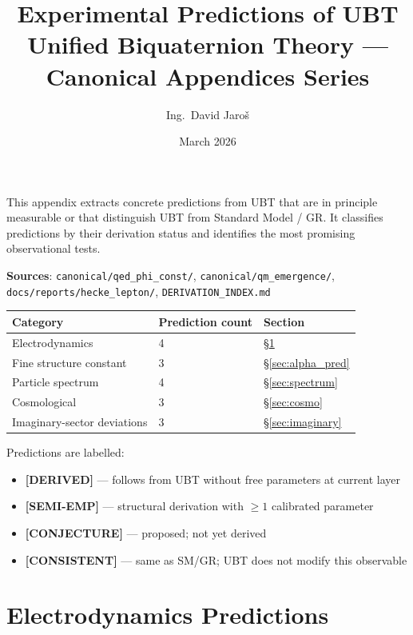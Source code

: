\documentclass[11pt,a4paper]{article}
\title{\textbf{Experimental Predictions of UBT}\\
\large Unified Biquaternion Theory — Canonical Appendices Series}
\author{Ing.\ David Jaroš}
\date{March 2026}
\theoremstyle{definition}
\theoremstyle{remark}
\begin{document}
\maketitle
\tableofcontents
\bigskip

\begin{tcolorbox}[colback=blue!4!white,colframe=blue!50!black,title=Purpose]
This appendix extracts concrete predictions from UBT that are in principle
measurable or that distinguish UBT from Standard Model / GR.
It classifies predictions by their derivation status and identifies the
most promising observational tests.

\medskip
\textbf{Sources}:
\texttt{canonical/qed\_phi\_const/},
\texttt{canonical/qm\_emergence/},
\texttt{docs/reports/hecke\_lepton/},
\texttt{DERIVATION\_INDEX.md}

\medskip
\begin{tabular}{lll}
\hline
Category & Prediction count & Section \\
\hline
Electrodynamics & 4 & \S\ref{sec:qed} \\
Fine structure constant & 3 & \S\ref{sec:alpha_pred} \\
Particle spectrum & 4 & \S\ref{sec:spectrum} \\
Cosmological & 3 & \S\ref{sec:cosmo} \\
Imaginary-sector deviations & 3 & \S\ref{sec:imaginary} \\
\hline
\end{tabular}
\end{tcolorbox}

\begin{tcolorbox}[colback=yellow!5!white,colframe=orange!60!black,title=Prediction classification]
Predictions are labelled:
\begin{itemize}
  \item \textbf{[DERIVED]} — follows from UBT without free parameters at current layer
  \item \textbf{[SEMI-EMP]} — structural derivation with $\geq 1$ calibrated parameter
  \item \textbf{[CONJECTURE]} — proposed; not yet derived
  \item \textbf{[CONSISTENT]} — same as SM/GR; UBT does not modify this observable
\end{itemize}
\end{tcolorbox}

\section{Electrodynamics Predictions}\label{sec:qed}
\end{document}
